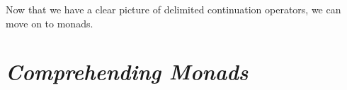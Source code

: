 \documentclass[acmsmall, nonacm, screen]{acmart}
\newcommand{\reset}[1]{\langle #1 \rangle}
\newcommand{\lambdaE}[2]{\lambda #1.\, #2}
\newcommand{\cps}[1]{\mathcal{C}\llbracket #1 \rrbracket}
\begin{document}



Now that we have a clear picture of delimited continuation operators, we can move on to monads.

\section{{\em Comprehending Monads}} \label{sec:wadler}
\end{document}
